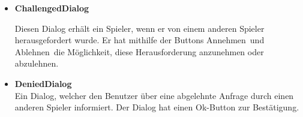 \documentclass[parskip=full]{scrartcl}
\begin{document}
\begin{itemize}
					\item \textbf{\Large{ChallengedDialog}}
					
					Diesen Dialog erhält ein Spieler, wenn er von einem anderen Spieler herausgefordert wurde. Er hat mithilfe der Buttons \glqq Annehmen\grqq\ und \glqq Ablehnen\grqq\ die Möglichkeit, diese Herausforderung anzunehmen oder abzulehnen.
					
					\item \textbf{\Large{DeniedDialog}}\\
					Ein Dialog, welcher den Benutzer über eine abgelehnte Anfrage durch einen anderen Spieler informiert. Der Dialog hat einen \glqq Ok\grqq -Button zur Bestätigung.
					
			
				\end{itemize}
				
		\newpage
		
\end{document}
